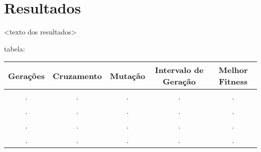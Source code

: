 \section{Resultados}

<texto dos resultados>

tabela:

\begin{tabular}{ccccc}
  \hline
  Gerações & Cruzamento & Mutação & Intervalo de Geração & Melhor Fitness \\
  \hline
  \hline
  . & . & . & . & . \\
  . & . & . & . & . \\
  . & . & . & . & . \\
  . & . & . & . & . \\
  \hline
\end{tabular}
